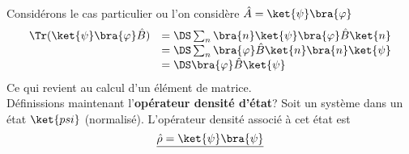 Considérons le cas particulier ou l'on considère $\hat{A}=\ket{\psi}\bra{\varphi}$
\begin{equation}
\begin{array}{ll}
\Tr(\ket{\psi}\bra{\varphi}\hat{B}) &=\DS \sum_n \bra{n}\ket{\psi}\bra{\varphi}\hat{B}\ket{n}\\
&=\DS \sum_n \bra{\varphi}\hat{B}\ket{n}\bra{n}\ket{\psi} \\
&=\DS \bra{\varphi}\hat{B}\ket{\psi}
\end{array}
\end{equation}
Ce qui revient au calcul d'un élément de matrice.\\

Définissions maintenant l'\textbf{opérateur densité d'état}? Soit un système dans un état $\ket{psi}$ (normalisé). L'opérateur densité associé à cet état est 
\begin{equation}
\underline{\hat{\rho} = \ket{\psi}\bra{\psi}}
\end{equation}
